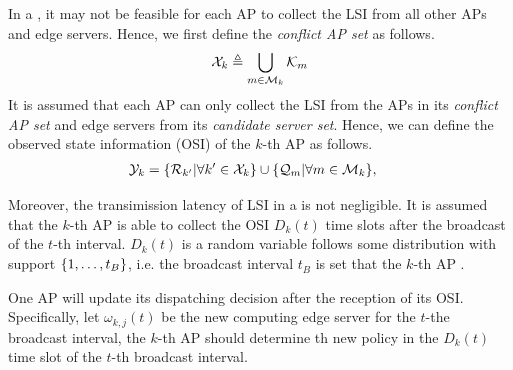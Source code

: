 In a , it may not be feasible for each AP to collect the LSI from all other APs and edge servers.
Hence, we first define the \emph{conflict AP set} as follows.
\begin{align}
    \mathcal{X}_{k} \triangleq \bigcup_{m\in\mathcal{M}_{k}} \mathcal{K}_{m}
\end{align}
It is assumed that each AP can only collect the LSI from the APs in its \emph{conflict AP set} and edge servers from its \emph{candidate server set}.
Hence, we can define the observed state information (OSI) of the $k$-th AP as follows.
\begin{align}
    \mathcal{Y}_{k} &= \{\mathcal{R}_{k'} | \forall k'\in\mathcal{X}_{k}\}
                    \cup \{\mathcal{Q}_{m} | \forall m\in\mathcal{M}_{k}\},
\end{align}

Moreover, the transimission latency of LSI in a  is not negligible.
It is assumed that the $k$-th AP is able to collect the OSI $D_{k}(t)$ time slots after the broadcast of the $t$-th interval.
$D_{k}(t)$ is a random variable follows some distribution with support $\{1,\dots,t_B\}$, i.e. the broadcast interval $t_B$ is set that the $k$-th AP .

One AP will update its dispatching decision after the reception of its OSI.
Specifically, let $\omega_{k,j}(t)$ be the new computing edge server for the $t$-the broadcast interval, the $k$-th AP should determine th new policy in the $D_{k}(t)$ time slot of the $t$-th broadcast interval.

